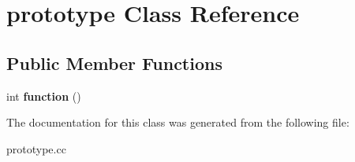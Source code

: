 \hypertarget{classprototype}{\section{prototype \-Class \-Reference}
\label{classprototype}
}
\subsection*{\-Public \-Member \-Functions}
\begin{DoxyCompactItemize}
\item 
\hypertarget{classprototype_a35595c02ee1bc2b9b6714361649024f3}{int {\bfseries function} ()}\label{classprototype_a35595c02ee1bc2b9b6714361649024f3}

\end{DoxyCompactItemize}


\-The documentation for this class was generated from the following file\-:\begin{DoxyCompactItemize}
\item 
prototype.\-cc\end{DoxyCompactItemize}
